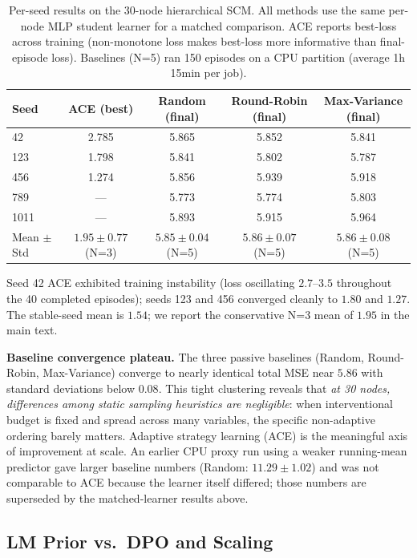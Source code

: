 \begin{table}[h]
\centering
\caption{Per-seed results on the 30-node hierarchical SCM. All methods use the same per-node MLP student learner for a matched comparison. ACE reports best-loss across training (non-monotone loss makes best-loss more informative than final-episode loss). Baselines (N=5) ran 150 episodes on a CPU partition (average 1h 15min per job).}
\label{tab:30node-perseed}
\small
\begin{tabular}{@{}l cccc@{}}
\toprule
Seed & ACE (best) & Random (final) & Round-Robin (final) & Max-Variance (final) \\
\midrule
42   & 2.785 & 5.865 & 5.852 & 5.841 \\
123  & 1.798 & 5.841 & 5.802 & 5.787 \\
456  & 1.274 & 5.856 & 5.939 & 5.918 \\
789  & ---   & 5.773 & 5.774 & 5.803 \\
1011 & ---   & 5.893 & 5.915 & 5.964 \\
\midrule
Mean $\pm$ Std & $1.95\pm0.77$ (N=3) & $5.85\pm0.04$ (N=5) & $5.86\pm0.07$ (N=5) & $5.86\pm0.08$ (N=5) \\
\bottomrule
\end{tabular}
\end{table}

Seed 42 ACE exhibited training instability (loss oscillating $2.7$--$3.5$ throughout the 40 completed episodes); seeds 123 and 456 converged cleanly to $1.80$ and $1.27$. The stable-seed mean is $1.54$; we report the conservative N=3 mean of $1.95$ in the main text.

\textbf{Baseline convergence plateau.} The three passive baselines (Random, Round-Robin, Max-Variance) converge to nearly identical total MSE near $5.86$ with standard deviations below $0.08$. This tight clustering reveals that \emph{at 30 nodes, differences among static sampling heuristics are negligible}: when interventional budget is fixed and spread across many variables, the specific non-adaptive ordering barely matters. Adaptive strategy learning (ACE) is the meaningful axis of improvement at scale. An earlier CPU proxy run using a weaker running-mean predictor gave larger baseline numbers (Random: $11.29\pm1.02$) and was not comparable to ACE because the learner itself differed; those numbers are superseded by the matched-learner results above.

\subsection{LM Prior vs.\ DPO and Scaling}
\label{app:scaling}

